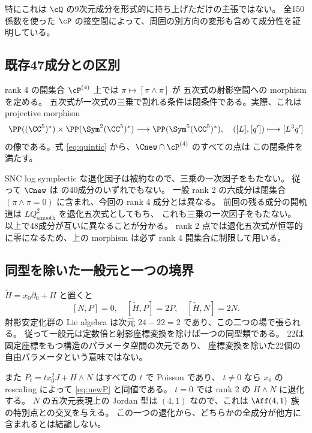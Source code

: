 特にこれは $\cQ$ の9次元成分を形式的に持ち上げただけの主張ではない。
全150係数を使った $\cP$ の接空間によって、周囲の別方向の変形も含めて成分性を証明している。

\subsection{既存47成分との区別}
rank 4 の開集合 $\cP^{(4)}$ 上では $\pi\mapsto[\pi\wedge\pi]$ が
五次式の射影空間への morphism を定める。
五次式が一次式の三乗で割れる条件は閉条件である。実際、これは projective morphism
\[
 \PP((\CC^5)^*)\times\PP(\Sym^2(\CC^5)^*)
 \longrightarrow\PP(\Sym^5(\CC^5)^*),\quad
 ([L],[q'])\longmapsto[L^3q']
\]
の像である。式 \eqref{eq:quintic} から、$\Cnew\cap\cP^{(4)}$ のすべての点は
この閉条件を満たす。

SNC log symplectic な退化因子は被約なので、三乗の一次因子をもたない。
従って $\Cnew$ は \cite[Theorem 1.4]{MPS} の40成分のいずれでもない。
一般 rank 2 の六成分は閉集合 $(\pi\wedge\pi=0)$ に含まれ、今回の rank 4 成分とは異なる。
前回の残る成分の開軌道は $LQ_{\mathrm{smooth}}^2$ を退化五次式としてもち、
これも三乗の一次因子をもたない。
以上で48成分が互いに異なることが分かる。
rank 2 点では退化五次式が恒等的に零になるため、上の morphism は必ず rank 4 開集合に制限して用いる。

\subsection{同型を除いた一般元と一つの境界}
$\widetilde H=x_0\partial_0+H$ と置くと
\[
 [N,P]=0,\quad [\widetilde H,P]=2P,\quad [\widetilde H,N]=2N.
\]
射影安定化群の Lie algebra は次元 $24-22=2$ であり、この二つの場で張られる。
従って一般元は定数倍と射影座標変換を除けば一つの同型類である。
22は固定座標をもつ構造のパラメータ空間の次元であり、
座標変換を除いた22個の自由パラメータという意味ではない。

また $P_t=t x_0^2J+H\wedge N$ はすべての $t$ で Poisson であり、
$t\ne0$ なら $x_0$ の rescaling によって \eqref{eq:newP} と同値である。
$t=0$ では rank 2 の $H\wedge N$ に退化する。
$N$ の五次元表現上の Jordan 型は $(4,1)$ なので、これは
$\Aff(4,1)$ 族の特別点との交叉を与える。
この一つの退化から、どちらかの全成分が他方に含まれるとは結論しない。
